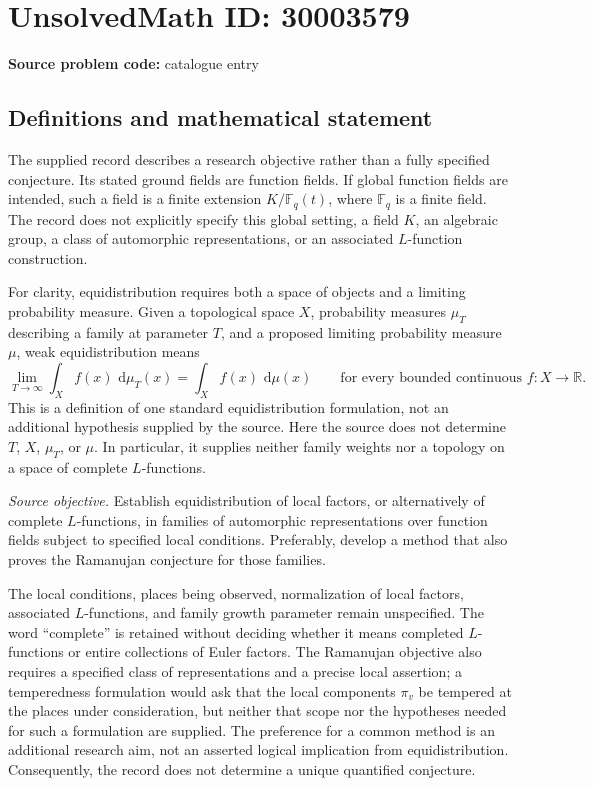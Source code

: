 \documentclass[11pt]{article}
\newcommand{\R}{\mathbb{R}}
\newcommand{\F}{\mathbb{F}}
\newcommand{\dd}{\,\mathrm{d}}
\begin{document}
\section*{UnsolvedMath ID: 30003579}
\textbf{Source problem code:} catalogue entry
\subsection{Definitions and mathematical statement}
The supplied record describes a research objective rather than a fully specified conjecture. Its stated ground fields are function fields. If global function fields are intended, such a field is a finite extension \(K/\F_q(t)\), where \(\F_q\) is a finite field. The record does not explicitly specify this global setting, a field \(K\), an algebraic group, a class of automorphic representations, or an associated \(L\)-function construction.

For clarity, equidistribution requires both a space of objects and a limiting probability measure. Given a topological space \(X\), probability measures \(\mu_T\) describing a family at parameter \(T\), and a proposed limiting probability measure \(\mu\), weak equidistribution means
\[
\lim_{T\to\infty}\int_X f(x)\,\dd\mu_T(x)
=\int_X f(x)\,\dd\mu(x)
\qquad\text{for every bounded continuous }f:X\to\R.
\]
This is a definition of one standard equidistribution formulation, not an additional hypothesis supplied by the source. Here the source does not determine \(T\), \(X\), \(\mu_T\), or \(\mu\). In particular, it supplies neither family weights nor a topology on a space of complete \(L\)-functions.

\emph{Source objective.} Establish equidistribution of local factors, or alternatively of complete \(L\)-functions, in families of automorphic representations over function fields subject to specified local conditions. Preferably, develop a method that also proves the Ramanujan conjecture for those families.

The local conditions, places being observed, normalization of local factors, associated \(L\)-functions, and family growth parameter remain unspecified. The word ``complete'' is retained without deciding whether it means completed \(L\)-functions or entire collections of Euler factors. The Ramanujan objective also requires a specified class of representations and a precise local assertion; a temperedness formulation would ask that the local components \(\pi_v\) be tempered at the places under consideration, but neither that scope nor the hypotheses needed for such a formulation are supplied. The preference for a common method is an additional research aim, not an asserted logical implication from equidistribution. Consequently, the record does not determine a unique quantified conjecture.
\end{document}
